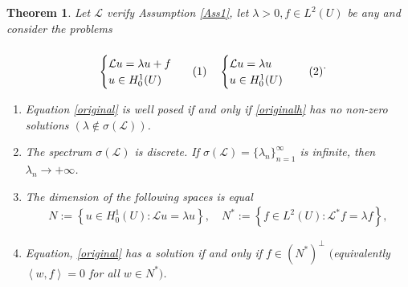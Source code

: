 \documentclass[
    a4paper,
    DIV=14,
    abstract=true,
    numbers=noenddot
]
{scrartcl}
\newtheorem{theorem}{Theorem}[section]
\theoremstyle{definition}
\newcommand{\br}[1]{\left\langle#1\right\rangle}
\newcommand{\set}[1]{\left\{#1\right\}}
\newcommand{\Ll}{\mathcal{L}}
\begin{document}
\begin{theorem}\label{well posednesss Fredholm}
	Let $\Ll$ verify Assumption \ref{Ass1}, let $\lambda>0, f \in L^2(U)$ be any and consider the problems
	\begin{align}
		\begin{minipage}{0.3\linewidth}
			\begin{equation}
				\begin{cases}
					\Ll u = \lambda u+f \\
					u \in H_0^1(U)
				\end{cases}\label{original}
			\end{equation}
		\end{minipage}%
		\begin{minipage}{0.3\linewidth}
			\begin{equation}
				\begin{cases}
					\Ll u = \lambda u \\
					u \in H_0^1(U)
				\end{cases}\label{originalh}
			\end{equation}
		\end{minipage}.
	\end{align}
	\begin{enumerate}
		\item Equation \eqref{original} is well posed if and only if \eqref{originalh} has no non-zero solutions  $(\lambda \notin \sigma(\Ll))$.
		\item The spectrum $\sigma (\Ll )$ is discrete. If $\sigma(\Ll )= \{\lambda_n \}_{n=1}^\infty$ is infinite, then $\lambda _n \to +\infty$.
		\item The dimension of the following  spaces is equal
		      \begin{align*}
			      N:= \set{u \in H_0^1(U): \Ll u = \lambda u}, \quad N^*:= \set{f \in L^2(U): \Ll^* f = \lambda f},
		      \end{align*}
		\item Equation, \eqref{original} has a solution if and only if $f \in (N^*)^\perp$ $($equivalently $\br{w,f}=0$ for all $w \in N^* )$.
	\end{enumerate}
\end{theorem}
\end{document}
